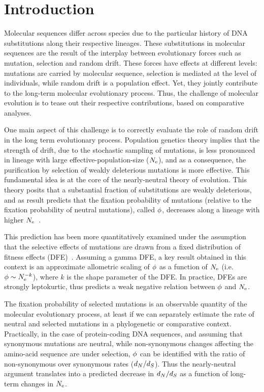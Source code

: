 \section{Introduction}
Molecular sequences differ across species due to the particular history of \acrshort{DNA} \glspl{substitution} along their respective lineages.
These \glspl{substitution} in molecular sequences are the result of the interplay between evolutionary forces such as mutation, selection and random \gls{drift}.
These forces have effects at different levels: mutations are carried by molecular sequence, selection is mediated at the level of individuals, while random \gls{drift} is a population effect.
Yet, they jointly contribute to the long-term molecular evolutionary process.
Thus, the challenge of molecular evolution is to tease out their respective contributions, based on comparative analyses.

One main aspect of this challenge is to correctly evaluate the role of random drift in the long term evolutionary process.
Population genetics theory implies that the strength of drift, due to the stochastic sampling of mutations, is less pronounced in lineage with large \gls{effective-population-size} ($N_{\mathrm{e}}$), and as a consequence, the purification by selection of weakly deleterious mutations is more effective.
This fundamental idea is at the core of the \gls{nearly-neutral} theory of evolution.
This theory posits that a substantial fraction of \glspl{substitution} are weakly deleterious, and as result predicts that the fixation probability of mutations (relative to the fixation probability of neutral mutations), called $\phi$, decreases along a lineage with higher $N_{\mathrm{e}}$~\citep{Ohta1972, Ohta1992}.

This prediction has been more quantitatively examined under the assumption that the selective effects of mutations are drawn from a fixed distribution of fitness effects (\acrshort{DFE})~\citep{Kimura1979, Welch2008}.
Assuming a gamma \acrshort{DFE}, a key result obtained in this context is an approximate allometric scaling of $\phi$ as a function of $N_{\mathrm{e}}$ (i.e. $\phi \sim N_{\mathrm{e}}^{-k}$), where $k$ is the shape parameter of the \acrshort{DFE}.
In practice, DFEs are strongly leptokurtic, thus predicts a weak negative relation between $\phi$ and $N_{\mathrm{e}}$.

The fixation probability of selected mutations is an observable quantity of the molecular evolutionary process, at least if we can separately estimate the rate of \gls{neutral} and selected mutations in a phylogenetic or comparative context.
Practically, in the case of protein-coding \acrshort{DNA} sequences, and assuming that synonymous mutations are \gls{neutral}, while non-synonymous changes affecting the amino-acid sequence are under selection, $\phi$ can be identified with the ratio of non-synonymous over \gls{synonymous} rates ($d_N / d_S$).
Thus the \gls{nearly-neutral} argument translates into a predicted decrease in $d_N / d_S$ as a function of long-term changes in $N_{\mathrm{e}}$.

